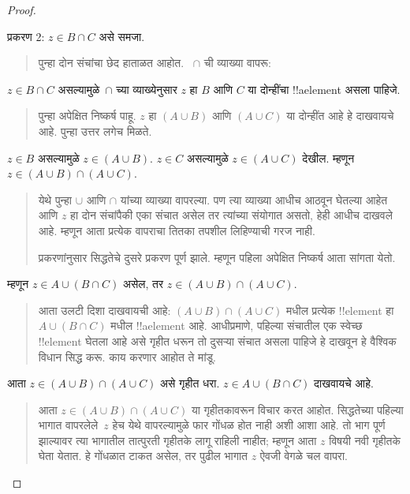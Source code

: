 \documentclass[../../../include/open-logic-section]{subfiles}
\begin{document}
\begin{proof}
\begin{quote}
\end{quote}
प्रकरण 2: $z \in B \cap C$ असे समजा.
\begin{quote}
पुन्हा दोन संचांचा छेद हाताळत आहोत. ~$ \cap$ ची व्याख्या वापरू:
\end{quote}
$z \in B \cap C$ असल्यामुळे~$\cap$ च्या व्याख्येनुसार $z$ हा $B$ आणि $C$ या दोन्हींचा !!a{element} असला पाहिजे.
\begin{quote}
पुन्हा अपेक्षित निष्कर्ष पाहू. $z$ हा $(A \cup B)$ आणि $(A \cup C)$ या दोन्हींत आहे हे दाखवायचे आहे. पुन्हा उत्तर लगेच मिळते.
\end{quote}
$z \in B$ असल्यामुळे $z \in (A \cup B)$. $z \in C$ असल्यामुळे $z \in (A \cup C)$ देखील. म्हणून $z \in (A \cup B) \cap (A \cup C)$.
\begin{quote}
येथे पुन्हा $\cup$ आणि $\cap$ यांच्या व्याख्या वापरल्या. पण त्या व्याख्या आधीच आठवून घेतल्या आहेत आणि $z$ हा दोन संचांपैकी एका संचात असेल तर त्यांच्या संयोगात असतो, हेही आधीच दाखवले आहे. म्हणून आता प्रत्येक वापराचा तितका तपशील लिहिण्याची गरज नाही.

प्रकरणांनुसार सिद्धतेचे दुसरे प्रकरण पूर्ण झाले. म्हणून पहिला अपेक्षित निष्कर्ष आता सांगता येतो.
\end{quote}
म्हणून $z \in A \cup (B \cap C)$ असेल, तर $z \in (A \cup B) \cap (A \cup C)$.
\begin{quote}
आता उलटी दिशा दाखवायची आहे: $(A \cup B) \cap (A \cup C)$ मधील प्रत्येक !!{element} हा $A \cup (B \cap C)$ मधील !!a{element} आहे. आधीप्रमाणे, पहिल्या संचातील एक स्वेच्छ !!{element} घेतला आहे असे गृहीत धरून तो दुसऱ्या संचात असला पाहिजे हे दाखवून हे वैश्विक विधान सिद्ध करू. काय करणार आहोत ते मांडू.
\end{quote}
आता $z \in (A \cup B) \cap (A \cup C)$ असे गृहीत धरा. $z \in A \cup (B \cap C)$ दाखवायचे आहे.
\begin{quote}
आता $z \in (A \cup B) \cap (A \cup C)$ या गृहीतकावरून विचार करत आहोत. सिद्धतेच्या पहिल्या भागात वापरलेले~$z$ हेच येथे वापरल्यामुळे फार गोंधळ होत नाही अशी आशा आहे. तो भाग पूर्ण झाल्यावर त्या भागातील तात्पुरती गृहीतके लागू राहिली नाहीत; म्हणून आता $z$ विषयी नवी गृहीतके घेता येतात. हे गोंधळात टाकत असेल, तर पुढील भागात $z$ ऐवजी वेगळे चल वापरा.


\end{quote}
\end{proof}
\end{document}
